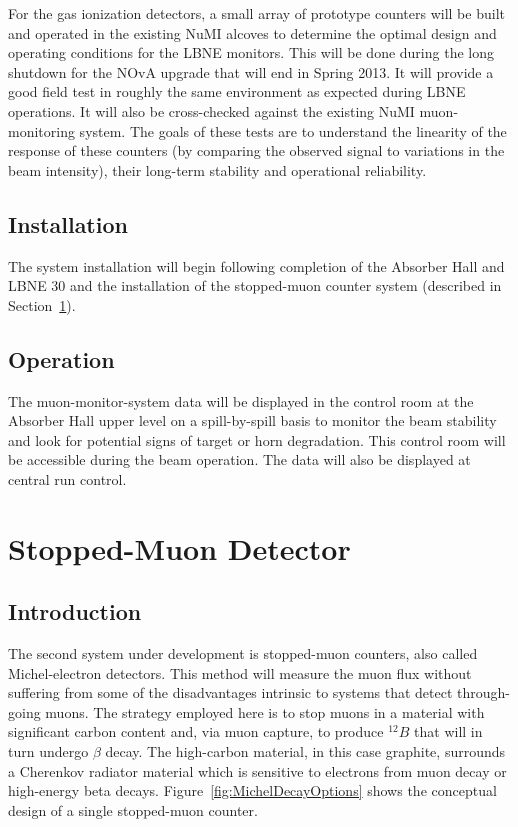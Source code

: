 For the gas ionization detectors, a small array of prototype
counters will be built and operated in the existing NuMI
alcoves to determine the optimal design and operating conditions for
the LBNE monitors. This will be done during the long
shutdown for the NOvA upgrade that will end in Spring 2013. 
It will provide a good field test in roughly the same environment as expected during LBNE
operations. It will also be cross-checked against the existing NuMI
muon-monitoring system.  The goals of these tests are to understand the linearity of the response of these counters (by comparing the observed signal to variations in the beam intensity), their long-term stability and operational reliability.  

\subsection{Installation}

The system installation will begin following completion of the
Absorber Hall and LBNE 30
and the installation of the stopped-muon counter system
(described in Section~\ref{v3ch3-stop-mu-det}).

\subsection{Operation}

The muon-monitor-system data will be displayed in the control room 
at the Absorber Hall upper level on
a spill-by-spill basis to monitor the beam stability and look for potential signs of target or horn degradation. 
This control room will be accessible during the beam operation.
The data will also be displayed at central run control.  

%
%
\section{Stopped-Muon Detector} %
\label{v3ch3-stop-mu-det}
\subsection{Introduction}

The second system under development is stopped-muon counters, also called
Michel-electron detectors. This method will measure the muon flux without
suffering from some of the disadvantages intrinsic to systems that
detect through-going muons. The strategy employed here is to stop muons
in a material with significant carbon content 
and, via muon capture, to produce $^{12}B$ that will in turn undergo $\beta$ decay.
 The high-carbon material, in this case graphite, surrounds a Cherenkov radiator
material which is sensitive to electrons from muon decay or 
high-energy beta decays.  Figure~\ref{fig:MichelDecayOptions} shows the conceptual design 
of a 
single stopped-muon counter. 



